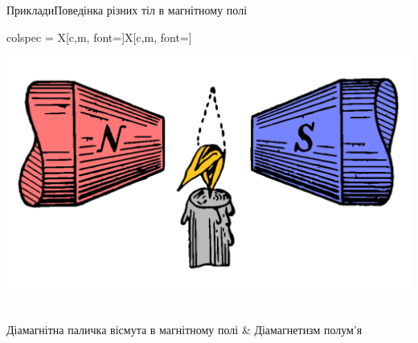 \documentclass[onlytextwidth]{beamer}
\begin{document}
\begin{frame}{Приклади}{Поведінка різних тіл в магнітному полі}
\begin{tblr}{
		colspec = {X[c,m, font=\small]X[c,m, font=\small]}
		}
		\begin{pict}\includegraphics[width=0.5\linewidth]{Flame_diamagnet}\end{pict}                                                     \\
		Діамагнітна паличка вісмута в магнітному полі                             & Діамагнетизм полум'я
	\end{tblr}
\end{frame}
\end{document}
